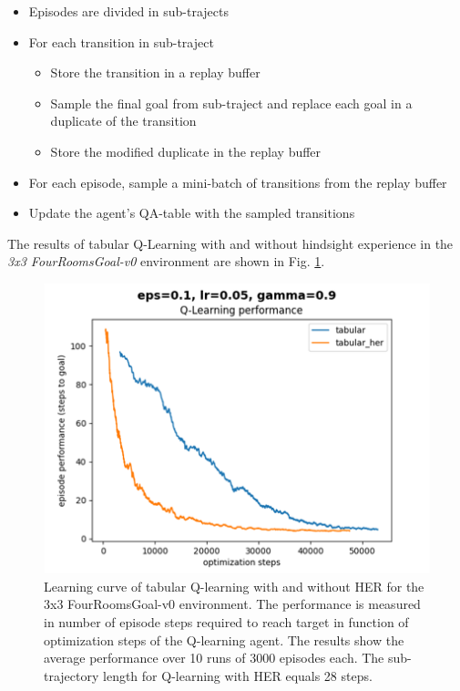 \documentclass[conference]{IEEEtran}
\begin{document}
\begin{itemize}
\item Episodes are divided in sub-trajects
\item For each transition in sub-traject
    \begin{itemize}
    \item Store the transition in a replay buffer
    \item Sample the final goal from sub-traject and replace each goal in a duplicate of the transition
    \item Store the modified duplicate in the replay buffer
    \end{itemize}
\item For each episode, sample a mini-batch of transitions from the replay buffer
\item Update the agent's QA-table with the sampled transitions
\end{itemize}
The results of tabular Q-Learning with and without hindsight experience in the \textit{3x3 FourRoomsGoal-v0} environment are shown in Fig. \ref{fig:experiment_fourroomsgoal_learning_performance}.

\begin{figure}[ht]
\centering
\includegraphics[width=0.9\columnwidth]{img/exp_tabular_her_fourroom_small.png}
\caption{Learning curve of tabular Q-learning with and without HER for the 3x3 FourRoomsGoal-v0 environment. The performance is measured in number of episode steps required to reach target in function of optimization steps of the Q-learning agent. The results show the average performance over 10 runs of 3000 episodes each. The sub-trajectory length for Q-learning with HER equals 28 steps.}
\label{fig:experiment_fourroomsgoal_learning_performance}
\end{figure}
\end{document}
